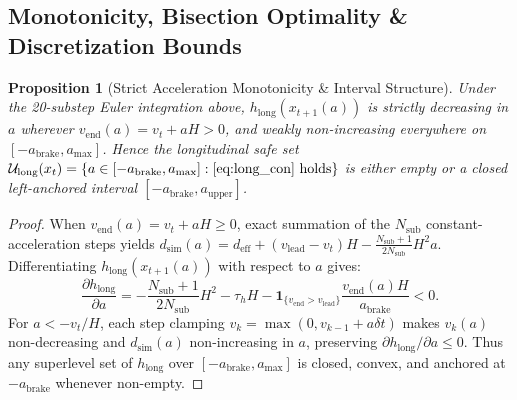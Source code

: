 \documentclass[journal]{IEEEtran}
\newtheorem{proposition}{Proposition}
\begin{document}
\subsection{Monotonicity, Bisection Optimality \& Discretization Bounds}
\begin{proposition}[Strict Acceleration Monotonicity \& Interval Structure]
Under the 20-substep Euler integration above, $h_{\text{long}}(x_{t+1}(a))$ is strictly decreasing in $a$ wherever $v_{\text{end}}(a) = v_t + aH > 0$, and weakly non-increasing everywhere on $[-a_{\text{brake}}, a_{\max}]$. Hence the longitudinal safe set $\mathcal{U}_{\text{long}}(x_t) = \{a \in [-a_{\text{brake}}, a_{\max}] : \eqref{eq:long_con}\text{ holds}\}$ is either empty or a closed left-anchored interval $[-a_{\text{brake}}, a_{\text{upper}}]$.
\end{proposition}
\begin{proof}
When $v_{\text{end}}(a) = v_t + aH \ge 0$, exact summation of the $N_{\text{sub}}$ constant-acceleration steps yields $d_{\text{sim}}(a) = d_{\text{eff}} + (v_{\text{lead}}-v_t)H - \frac{N_{\text{sub}}+1}{2N_{\text{sub}}}H^2 a$. Differentiating $h_{\text{long}}(x_{t+1}(a))$ with respect to $a$ gives:
\begin{equation}
\frac{\partial h_{\text{long}}}{\partial a}
= -\frac{N_{\text{sub}}{+}1}{2N_{\text{sub}}}H^2 - \tau_h H
  - \mathbf{1}_{\{v_{\text{end}}>v_{\text{lead}}\}}\frac{v_{\text{end}}(a)H}{a_{\text{brake}}} < 0.
\end{equation}
For $a < -v_t/H$, each step clamping $v_k = \max(0, v_{k-1}+a\delta t)$ makes $v_k(a)$ non-decreasing and $d_{\text{sim}}(a)$ non-increasing in $a$, preserving $\partial h_{\text{long}}/\partial a \le 0$. Thus any superlevel set of $h_{\text{long}}$ over $[-a_{\text{brake}}, a_{\max}]$ is closed, convex, and anchored at $-a_{\text{brake}}$ whenever non-empty.
\end{proof}
\end{document}
